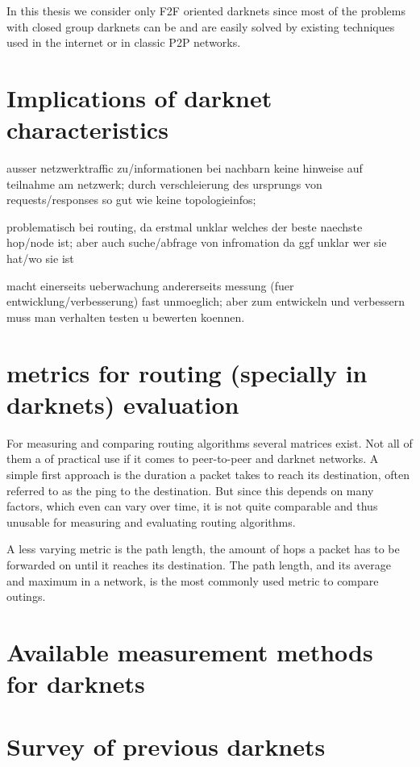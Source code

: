 In this thesis we consider only F2F oriented darknets since most of the problems with closed group darknets can be and are easily solved by existing techniques used in the internet or in classic P2P networks.

\section{Implications of darknet characteristics}

ausser netzwerktraffic zu/informationen bei nachbarn keine hinweise auf teilnahme am netzwerk; durch verschleierung des ursprungs von requests/responses so gut wie keine topologieinfos;

problematisch bei routing, da erstmal unklar welches der beste naechste hop/node ist; aber auch suche/abfrage von infromation da ggf unklar wer sie hat/wo sie ist

macht einerseits ueberwachung andererseits messung (fuer entwicklung/verbesserung) fast unmoeglich; aber zum entwickeln und verbessern muss man verhalten testen u bewerten koennen.

\section{metrics for routing (specially in darknets) evaluation}

For measuring and comparing routing algorithms several matrices exist. Not all of them a of practical use if it comes to peer-to-peer and darknet networks. A simple first approach  is the duration a packet takes to reach its destination, often referred to as the ping to the destination. But since this depends on many factors, which even can vary over time, it is not quite comparable and thus unusable for measuring and evaluating routing algorithms.

A less varying metric is the path length, the amount of hops a packet has to be forwarded on until it reaches its destination. The path length, and its average and maximum in a network, is the most commonly used metric to compare outings.



\section{Available measurement methods for darknets}


\section{Survey of previous darknets}


